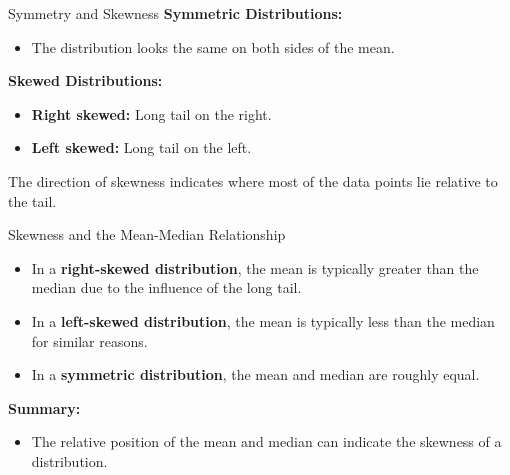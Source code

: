 \documentclass[handout]{beamer} %
\begin{document}
\begin{frame}{Symmetry and Skewness}
    \textbf{Symmetric Distributions:}
    \begin{itemize}
        \item The distribution looks the same on both sides of the mean.
    \end{itemize}

    \vspace{0.3cm}
    \textbf{Skewed Distributions:}
    \begin{itemize}
        \item \textbf{Right skewed:} Long tail on the right.
        \item \textbf{Left skewed:} Long tail on the left.
    \end{itemize}

    \vspace{0.3cm}
    The direction of skewness indicates where most of the data points lie relative to the tail.
\end{frame}

\begin{frame}{Skewness and the Mean-Median Relationship}
    \begin{itemize}
        \item In a \textbf{right-skewed distribution}, the mean is typically greater than the median due to the influence of the long tail.
        \item In a \textbf{left-skewed distribution}, the mean is typically less than the median for similar reasons.
        \item In a \textbf{symmetric distribution}, the mean and median are roughly equal.
    \end{itemize}

    \vspace{0.5cm}
    \textbf{Summary:}
    \begin{itemize}
        \item The relative position of the mean and median can indicate the skewness of a distribution.
    \end{itemize}
\end{frame}
\end{document}
